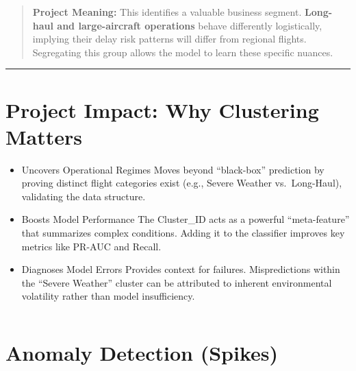 \documentclass[11pt]{article}
\makeatletter
\newcommand{\boxspacing}{\kern\kvtcb@left@rule\kern\kvtcb@boxsep}
\newcommand{\prompt}[4]{
        {\ttfamily\llap{{\color{#2}[#3]:\hspace{3pt}#4}}\vspace{-\baselineskip}}
    }
\makeatother
\begin{document}
\begin{quote}
\textbf{Project Meaning:} This identifies a valuable business segment.
\textbf{Long-haul and large-aircraft operations} behave differently
logistically, implying their delay risk patterns will differ from
regional flights. Segregating this group allows the model to learn these
specific nuances.
\end{quote}

\begin{center}\rule{0.5\linewidth}{0.5pt}\end{center}

    

    \section{Project Impact: Why Clustering
Matters}\label{project-impact-why-clustering-matters}

\begin{itemize}
\item
  Uncovers Operational Regimes Moves beyond ``black-box'' prediction by
  proving distinct flight categories exist (e.g., Severe Weather
  vs.~Long-Haul), validating the data structure.
\item
  Boosts Model Performance The Cluster\_ID acts as a powerful
  ``meta-feature'' that summarizes complex conditions. Adding it to the
  classifier improves key metrics like PR-AUC and Recall.
\item
  Diagnoses Model Errors Provides context for failures. Mispredictions
  within the ``Severe Weather'' cluster can be attributed to inherent
  environmental volatility rather than model insufficiency.
\end{itemize}

    \begin{tcolorbox}[breakable, size=fbox, boxrule=1pt, pad at break*=1mm,colback=cellbackground, colframe=cellborder]
\prompt{In}{incolor}{ }{\boxspacing}
\begin{Verbatim}[commandchars=\\\{\}]

\end{Verbatim}
\end{tcolorbox}

    \section{Anomaly Detection (Spikes)}\label{anomaly-detection-spikes}
\end{document}
